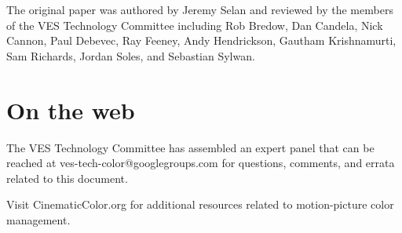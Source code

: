 The original paper was authored by Jeremy Selan and reviewed by the members of the VES Technology Committee including Rob Bredow, Dan Candela, Nick Cannon, Paul Debevec, Ray Feeney, Andy Hendrickson, Gautham Krishnamurti, Sam Richards, Jordan Soles, and Sebastian Sylwan.

\section*{On the web}

The VES Technology Committee has assembled an expert panel that can be reached at ves-tech-color@googlegroups.com for questions, comments, and errata related to this document.

Visit CinematicColor.org for additional resources related to motion-picture color management.
